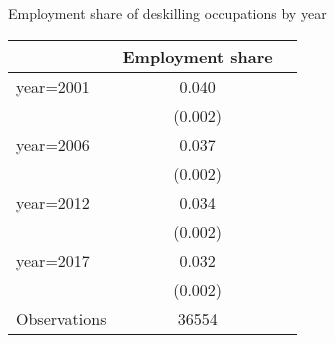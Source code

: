 \begin{center}
\begin{threeparttable}[!h]
\caption{Employment share of deskilling occupations by year}
\begin{tabular}{lcc}
\toprule
\toprule
\textbf{}&\multicolumn{1}{c}{\textbf{Employment share}}&\multicolumn{1}{c}{\textbf{ }} \\
\midrule
year=2001           &       0.040\\
                    &     (0.002)\\
year=2006           &       0.037\\
                    &     (0.002)\\
year=2012           &       0.034\\
                    &     (0.002)\\
year=2017           &       0.032\\
                    &     (0.002)\\
Observations        &       36554\\
\bottomrule
\bottomrule
\end{tabular}
\end{threeparttable}
\end{center}
